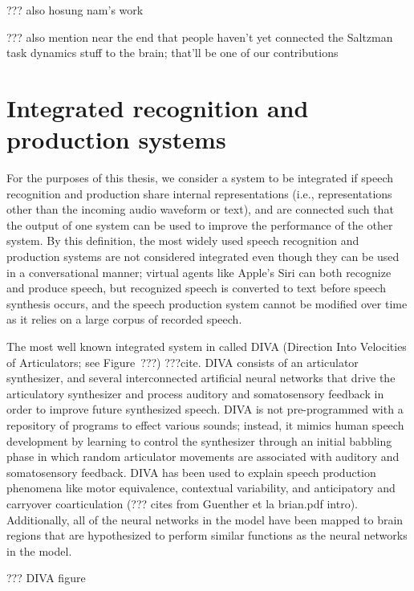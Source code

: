 ??? also hosung nam's work

??? also mention near the end that people haven't
yet connected the Saltzman task dynamics stuff
to the brain; that'll be one of our contributions

\section{Integrated recognition and production systems}

For the purposes of this thesis,
we consider a system to be integrated
if speech recognition and production
share internal representations
(i.e., representations other than
the incoming audio waveform or text),
and are connected such that
the output of one system
can be used to improve
the performance of the other system.
By this definition,
the most widely used
speech recognition and production systems
are not considered integrated
even though they can be used
in a conversational manner;
virtual agents like Apple's Siri
can both recognize and produce speech,
but recognized speech is converted
to text before speech synthesis occurs,
and the speech production system
cannot be modified over time
as it relies on a large corpus
of recorded speech.

The most well known integrated system
in called DIVA
(Direction Into Velocities of Articulators;
see Figure~???) ???cite.
DIVA consists of an articulator synthesizer,
and several interconnected artificial neural networks
that drive the articulatory synthesizer
and process auditory and somatosensory feedback
in order to improve future synthesized speech.
DIVA is not pre-programmed with a repository
of programs to effect various sounds;
instead, it mimics human speech development
by learning to control the synthesizer
through an initial babbling phase
in which random articulator movements
are associated with auditory
and somatosensory feedback.
DIVA has been used to explain
speech production phenomena
like motor equivalence, contextual variability,
and anticipatory and carryover coarticulation
(??? cites from Guenther et la brian.pdf intro).
Additionally, all of the neural networks
in the model have been mapped
to brain regions that are hypothesized
to perform similar functions
as the neural networks in the model.

??? DIVA figure

